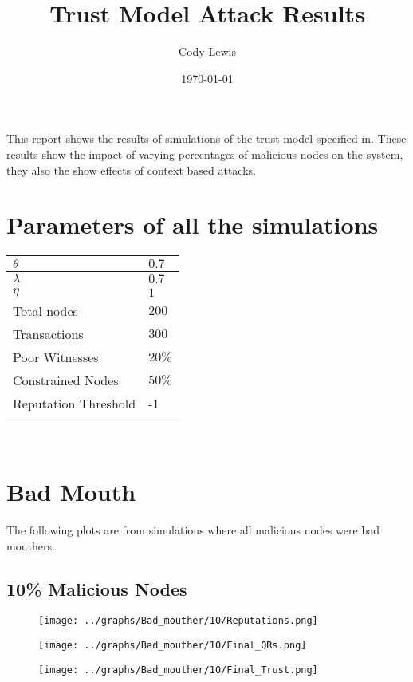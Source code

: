 \documentclass{article}
\title{Trust Model Attack Results}
\author{Cody Lewis}
\date{\today}
\begin{document}
  \maketitle
  This report shows the results of simulations of the trust model specified
  in\cite{saied13}. These results show the impact of varying percentages of
  malicious nodes on the system, they also the show effects of context based
  attacks.
  \section*{Parameters of all the simulations}
    \begin{tabularx}{\textwidth}{X X}
        \toprule
        $ \theta{} $ & $ 0.7 $ \\
        \midrule
        $ \lambda{} $ & $ 0.7 $ \\
        \midrule
        $ \eta{} $ & $ 1 $ \\
        \midrule
        Total nodes & $ 200 $ \\
        \midrule
        Transactions & $ 300 $ \\
        \midrule
        Poor Witnesses & $ 20\% $ \\
        \midrule
        Constrained Nodes & $ 50\% $ \\
        \midrule
        Reputation Threshold & -1 \\
        \bottomrule
    \end{tabularx} \\
  \newpage
  \section*{Bad Mouth}
    The following plots are from simulations where all malicious nodes were
    bad mouthers.
    \\
  \begin{minipage}[t]{0.49\columnwidth}
    \subsection*{10\% Malicious Nodes}
        \begin{figure}[H]
            \centering
            \texttt{[image: ../graphs/Bad\_mouther/10/Reputations.png]}
        \end{figure}
        \begin{figure}[H]
            \centering
            \texttt{[image: ../graphs/Bad\_mouther/10/Final\_QRs.png]}
        \end{figure}
    \end{minipage}
    \begin{minipage}[t]{0.49\columnwidth}
        \begin{figure}[H]
            \centering
            \texttt{[image: ../graphs/Bad\_mouther/10/Final\_Trust.png]}
        \end{figure}
    \end{minipage}
\end{document}
